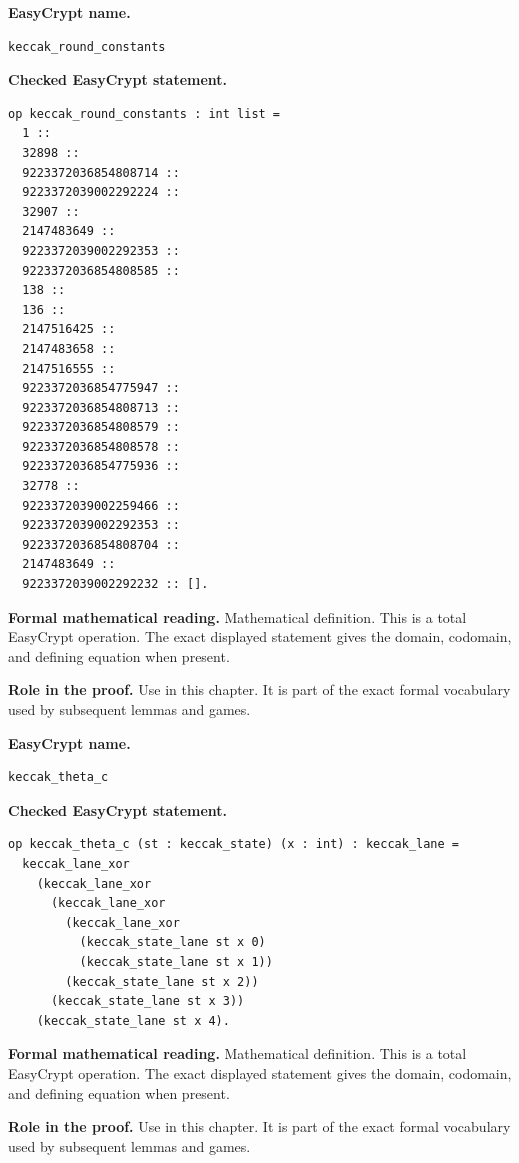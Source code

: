 \begin{formaldefinition}
\noindent\textbf{EasyCrypt name.}
\begin{lstlisting}[language=EasyCrypt,basicstyle=\ttfamily\scriptsize]
keccak_round_constants
\end{lstlisting}
\noindent\textbf{Checked EasyCrypt statement.}
\begin{lstlisting}[language=EasyCrypt,basicstyle=\ttfamily\scriptsize]
op keccak_round_constants : int list =
  1 ::
  32898 ::
  9223372036854808714 ::
  9223372039002292224 ::
  32907 ::
  2147483649 ::
  9223372039002292353 ::
  9223372036854808585 ::
  138 ::
  136 ::
  2147516425 ::
  2147483658 ::
  2147516555 ::
  9223372036854775947 ::
  9223372036854808713 ::
  9223372036854808579 ::
  9223372036854808578 ::
  9223372036854775936 ::
  32778 ::
  9223372039002259466 ::
  9223372039002292353 ::
  9223372036854808704 ::
  2147483649 ::
  9223372039002292232 :: [].
\end{lstlisting}
\noindent\textbf{Formal mathematical reading.}
Mathematical definition. This is a total EasyCrypt operation.  The exact displayed statement gives the domain, codomain, and defining equation when present.

\noindent\textbf{Role in the proof.}
Use in this chapter. It is part of the exact formal vocabulary used by subsequent lemmas and games.

\end{formaldefinition}

\begin{formaldefinition}
\noindent\textbf{EasyCrypt name.}
\begin{lstlisting}[language=EasyCrypt,basicstyle=\ttfamily\scriptsize]
keccak_theta_c
\end{lstlisting}
\noindent\textbf{Checked EasyCrypt statement.}
\begin{lstlisting}[language=EasyCrypt,basicstyle=\ttfamily\scriptsize]
op keccak_theta_c (st : keccak_state) (x : int) : keccak_lane =
  keccak_lane_xor
    (keccak_lane_xor
      (keccak_lane_xor
        (keccak_lane_xor
          (keccak_state_lane st x 0)
          (keccak_state_lane st x 1))
        (keccak_state_lane st x 2))
      (keccak_state_lane st x 3))
    (keccak_state_lane st x 4).
\end{lstlisting}
\noindent\textbf{Formal mathematical reading.}
Mathematical definition. This is a total EasyCrypt operation.  The exact displayed statement gives the domain, codomain, and defining equation when present.

\noindent\textbf{Role in the proof.}
Use in this chapter. It is part of the exact formal vocabulary used by subsequent lemmas and games.

\end{formaldefinition}

